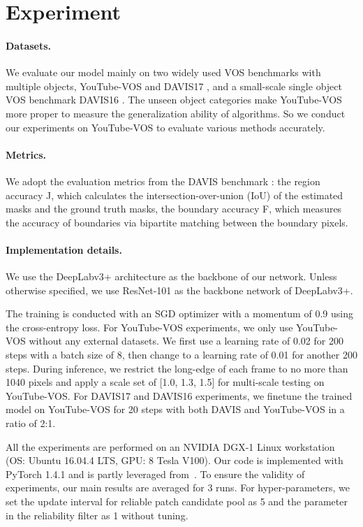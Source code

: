 \documentclass[letterpaper]{article} \usepackage{aaai22}  \usepackage{times}  \usepackage{helvet}  \usepackage{courier}  \usepackage[hyphens]{url}  \usepackage{graphicx} \urlstyle{rm} \def\UrlFont{\rm}  \usepackage{natbib}  \usepackage{caption} \DeclareCaptionStyle{ruled}{labelfont=normalfont,labelsep=colon,strut=off} \frenchspacing  \setlength{\pdfpagewidth}{8.5in}  \setlength{\pdfpageheight}{11in}  \usepackage{algorithm}
\begin{document}
\section{Experiment}\label{sec:Experiment}

\paragraph{Datasets.} We evaluate our model mainly on two widely used VOS benchmarks with multiple objects, YouTube-VOS \cite{xu2018youtube} and DAVIS17 \cite{pont20172017}, and a small-scale single object VOS benchmark DAVIS16 \cite{perazzi2016benchmark}.
The unseen object categories make YouTube-VOS more proper to measure the generalization ability of algorithms. So we conduct our experiments on YouTube-VOS to evaluate various methods accurately. 

\paragraph{Metrics.} We adopt the evaluation metrics from the DAVIS benchmark \cite{perazzi2016benchmark}: the region accuracy J, which calculates the intersection-over-union (IoU) of the estimated masks and the ground truth masks, the boundary accuracy F, which measures the accuracy of boundaries via bipartite matching between the boundary pixels. 

\paragraph{Implementation details.}

We use the DeepLabv3+ \cite{chen2018encoder} architecture as the backbone of our network. 
Unless otherwise specified, we use ResNet-101 as the backbone network of DeepLabv3+.

The training is conducted with an SGD optimizer with a momentum of 0.9 using the cross-entropy loss.
For YouTube-VOS experiments, we only use YouTube-VOS without any external datasets. We first use a learning rate of 0.02 for 200 steps with a batch size of 8, then change to a learning rate of 0.01 for another 200 steps. 
During inference, we restrict the long-edge of each frame to no more than 1040 pixels and apply a scale set of [1.0, 1.3, 1.5] for multi-scale testing on YouTube-VOS. For DAVIS17 and DAVIS16 experiments, we finetune the trained model on YouTube-VOS for 20 steps with both DAVIS and YouTube-VOS in a ratio of 2:1. 

All the experiments are performed on an NVIDIA DGX-1 Linux workstation (OS: Ubuntu 16.04.4 LTS, GPU: 8 Tesla V100). Our code is implemented with PyTorch 1.4.1 and is partly leveraged from~\cite{CFBI_REPO}. To ensure the validity of experiments, our main results are averaged for 3 runs. For hyper-parameters, we set the update interval  for reliable patch candidate pool  as 5 and the parameter  in the reliability filter as 1 without tuning.
\end{document}
